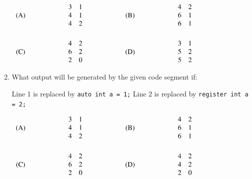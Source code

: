 \documentclass[journal]{IEEEtran}
\numberwithin{equation}{enumi}
\numberwithin{figure}{enumi}
\begin{document}
\begin{enumerate}
$
\begin{array}{c@{\hspace{2cm}}c@{\hspace{2cm}}c@{\hspace{2cm}}c}
\text{(A)} &
\begin{array}{cc}
3 & 1 \\ 4 & 1 \\ 4 & 2
\end{array}
&
\text{(B)} &
\begin{array}{cc}
4 & 2 \\ 6 & 1 \\ 6 & 1
\end{array}
\\[1cm]
\text{(C)} &
\begin{array}{cc}
4 & 2 \\ 6 & 2 \\ 2 & 0
\end{array}
&
\text{(D)} &
\begin{array}{cc}
3 & 1 \\ 5 & 2 \\ 5 & 2
\end{array}
\end{array}
$

\item What output will be generated by the given code segment if:  

Line 1 is replaced by \verb|auto int a = 1;|  
Line 2 is replaced by \verb|register int a = 2;|

$
\begin{array}{c@{\hspace{2cm}}c@{\hspace{2cm}}c@{\hspace{2cm}}c}
\text{(A)} &
\begin{array}{cc}
3 & 1 \\ 4 & 1 \\ 4 & 2
\end{array}
&
\text{(B)} &
\begin{array}{cc}
4 & 2 \\ 6 & 1 \\ 6 & 1
\end{array}
\\[1cm]
\text{(C)} &
\begin{array}{cc}
4 & 2 \\ 6 & 2 \\ 2 & 0
\end{array}
&
\text{(D)} &
\begin{array}{cc}
4 & 2 \\ 4 & 2 \\ 2 & 0
\end{array}
\end{array}
$


\end{enumerate}
\end{document}
